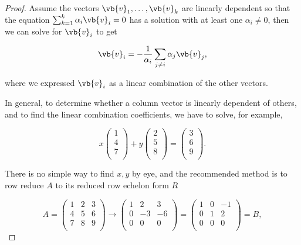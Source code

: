 \documentclass[a4paper,12pt]{report}
\begin{document}
\begin{proof}
Assume the vectors \(\vb{v} _{1}, \ldots , \vb{v} _{k}  \) are linearly dependent so that the equation \(\sum_{k=1}^{k} \alpha _{i} \vb{v} _{i}  = 0\) has a solution with at least one \(\alpha _{i} \neq 0 \), then we can solve for \(\vb{v} _{i} \) to get

\begin{equation}
    \vb{v} _{i} = -\frac{1}{\alpha _{i} } \sum_{j \neq i}^{} \alpha _{j} \vb{v} _{j} ,    
\end{equation}

where we expressed \(\vb{v} _{i} \) as a linear combination of the other vectors.

In general, to determine whether a column vector is linearly dependent of others, and to find the linear combination coefficients, we have to solve, for example,

\begin{equation}
    x \begin{pmatrix}
         1 \\
         4 \\
         7 \\
    \end{pmatrix} + y \begin{pmatrix}
         2 \\
         5 \\
         8 \\
    \end{pmatrix} = \begin{pmatrix}
         3 \\
         6 \\
         9 \\
    \end{pmatrix}.
\end{equation}

There is no simple way to find \(x,y\) by eye, and the recommended method is to row reduce \(A\) to its reduced row echelon form \(R\)

\begin{equation}
    A = \begin{pmatrix}
        1 & 2 &  3 \\
        4 & 5 &  6 \\
        7 & 8 &  9 \\
    \end{pmatrix} \to \begin{pmatrix}
        1 & 2 &  3 \\
        0 & -3 & -6 \\
        0 & 0 &  0 \\
    \end{pmatrix} = \begin{pmatrix}
        1 & 0 &  -1 \\
        0 & 1 &  2 \\
        0 & 0 &  0 \\
    \end{pmatrix} = B,
\end{equation}


\end{proof}
\end{document}
